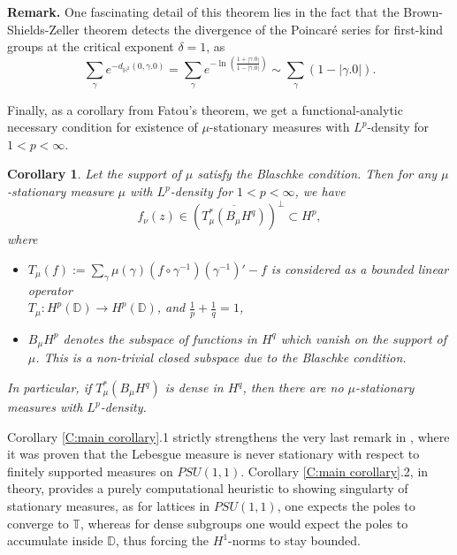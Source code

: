 \documentclass[11pt]{article}
\newtheorem{corollary}{Corollary}[section]
\begin{document}
\textbf{Remark.} One fascinating detail of this theorem lies in the fact that the Brown-Shields-Zeller theorem detects the divergence of the Poincar\'e series for first-kind groups at the critical exponent $\delta = 1$, as
\[
\sum_{\gamma} e^{- d_{\mathbb{H}^2}(0, \gamma.0)} = \sum_{\gamma} e^{-\ln\left( \frac{1 + |\gamma.0|}{1 - |\gamma.0|} \right)} \sim \sum_{\gamma} (1 - |\gamma.0|).
\]

Finally, as a corollary from Fatou's theorem, we get a functional-analytic necessary condition for existence of $\mu$-stationary measures with $L^p$-density for $1 < p < \infty$.

\begin{corollary}
	\label{functional-analytic necessary condition}
	Let the support of $\mu$ satisfy the Blaschke condition. Then for any $\mu$-stationary measure $\mu$ with $L^p$-density for $1 < p < \infty$, we have
	\[
	f_\nu(z) \in (\overline{T_\mu^*(B_\mu H^q)})^{\perp} \subset H^p,
	\]
	where
	\begin{itemize}
		\item $T_\mu(f) := \sum_{\gamma} \mu(\gamma) (f \circ \gamma^{-1}) (\gamma^{-1})' - f$ is considered as a bounded linear operator \\ $T_\mu : H^p(\mathbb{D}) \rightarrow H^p(\mathbb{D})$, and $\frac{1}{p} + \frac{1}{q} = 1$,
		\item $B_\mu H^p$ denotes the subspace of functions in $H^q$ which vanish on the support of $\mu$. This is a non-trivial closed subspace due to the Blaschke condition.
	\end{itemize}
	In particular, if $T_\mu^*(B_\mu H^q)$ is dense in $H^q$, then there are no $\mu$-stationary measures with $L^p$-density.
\end{corollary}


Corollary \ref{C:main corollary}.1 strictly strengthens the very last remark in \cite{Bourgain2012}, where it was proven that the Lebesgue measure is never stationary with respect to finitely supported measures on $PSU(1,1)$. Corollary \ref{C:main corollary}.2, in theory, provides a purely computational heuristic to showing singularty of stationary measures, as for lattices in $PSU(1,1)$, one expects the poles to converge to $\mathbb{T}$, whereas for dense subgroups one would expect the poles to accumulate inside $\mathbb{D}$, thus forcing the $H^1$-norms to stay bounded. 
\end{document}

